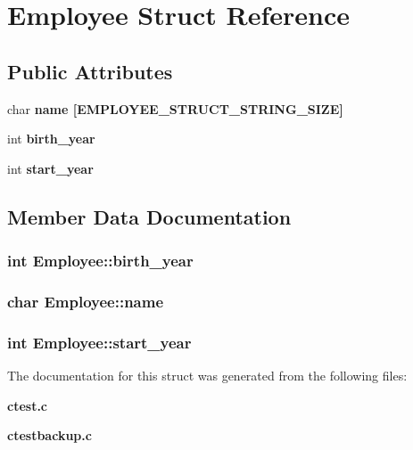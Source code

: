 \section{Employee Struct Reference}
\label{structEmployee}
\subsection*{Public Attributes}
\begin{CompactItemize}
\item 
char \bf{name} [EMPLOYEE\_\-STRUCT\_\-STRING\_\-SIZE]
\item 
int \bf{birth\_\-year}
\item 
int \bf{start\_\-year}
\end{CompactItemize}


\subsection{Member Data Documentation}
\subsubsection{\setlength{\rightskip}{0pt plus 5cm}int \bf{Employee::birth\_\-year}}\label{structEmployee_ef62371f00cb7dcd71e6317c132f8cf6}


\subsubsection{\setlength{\rightskip}{0pt plus 5cm}char \bf{Employee::name}}\label{structEmployee_f1e96a6106c4ef668f291016051037fa}


\subsubsection{\setlength{\rightskip}{0pt plus 5cm}int \bf{Employee::start\_\-year}}\label{structEmployee_b1a643cf1633914b5dc082af153e8ee7}




The documentation for this struct was generated from the following files:\begin{CompactItemize}
\item 
\bf{ctest.c}\item 
\bf{ctestbackup.c}\end{CompactItemize}

